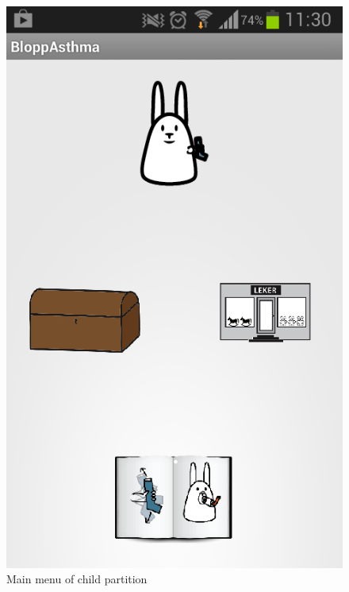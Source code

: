 \begin{figure}
	\begin{minipage}[t]{0.3\linewidth}
		\centering
			\includegraphics[width=0.20\paperwidth]{Pictures/new-screenshots/kid-menu.png}
		\caption{Main menu of child partition}
		\label{fig:child-menu}
	\end{minipage}
	\hspace{0.5cm}
	\begin{minipage}[t]{0.3\linewidth}
		\centering

\end{minipage}
\end{figure}
